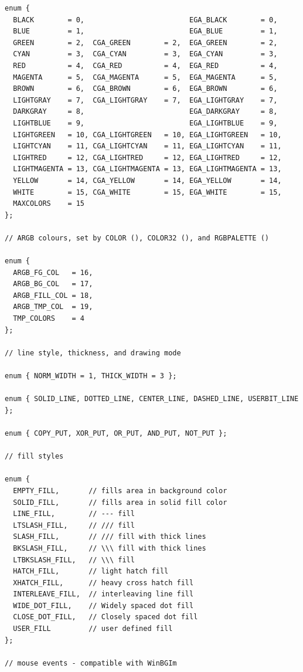 \documentclass[a4paper,12pt]{article}
\begin{document}
\begin{footnotesize}
\begin{spacing}{0.8}
\begin{verbatim}
enum {
  BLACK        = 0,                         EGA_BLACK        = 0,
  BLUE         = 1,                         EGA_BLUE         = 1,
  GREEN        = 2,  CGA_GREEN        = 2,  EGA_GREEN        = 2,
  CYAN         = 3,  CGA_CYAN         = 3,  EGA_CYAN         = 3,
  RED          = 4,  CGA_RED          = 4,  EGA_RED          = 4,
  MAGENTA      = 5,  CGA_MAGENTA      = 5,  EGA_MAGENTA      = 5,
  BROWN        = 6,  CGA_BROWN        = 6,  EGA_BROWN        = 6,
  LIGHTGRAY    = 7,  CGA_LIGHTGRAY    = 7,  EGA_LIGHTGRAY    = 7,
  DARKGRAY     = 8,                         EGA_DARKGRAY     = 8,
  LIGHTBLUE    = 9,                         EGA_LIGHTBLUE    = 9,
  LIGHTGREEN   = 10, CGA_LIGHTGREEN   = 10, EGA_LIGHTGREEN   = 10,
  LIGHTCYAN    = 11, CGA_LIGHTCYAN    = 11, EGA_LIGHTCYAN    = 11,
  LIGHTRED     = 12, CGA_LIGHTRED     = 12, EGA_LIGHTRED     = 12,
  LIGHTMAGENTA = 13, CGA_LIGHTMAGENTA = 13, EGA_LIGHTMAGENTA = 13,
  YELLOW       = 14, CGA_YELLOW       = 14, EGA_YELLOW       = 14,
  WHITE        = 15, CGA_WHITE        = 15, EGA_WHITE        = 15,
  MAXCOLORS    = 15
};

// ARGB colours, set by COLOR (), COLOR32 (), and RGBPALETTE ()

enum {
  ARGB_FG_COL   = 16,
  ARGB_BG_COL   = 17,
  ARGB_FILL_COL = 18,
  ARGB_TMP_COL  = 19,
  TMP_COLORS    = 4
};

// line style, thickness, and drawing mode

enum { NORM_WIDTH = 1, THICK_WIDTH = 3 };

enum { SOLID_LINE, DOTTED_LINE, CENTER_LINE, DASHED_LINE, USERBIT_LINE };

enum { COPY_PUT, XOR_PUT, OR_PUT, AND_PUT, NOT_PUT };

// fill styles

enum {
  EMPTY_FILL,       // fills area in background color
  SOLID_FILL,       // fills area in solid fill color
  LINE_FILL,        // --- fill
  LTSLASH_FILL,     // /// fill
  SLASH_FILL,       // /// fill with thick lines
  BKSLASH_FILL,     // \\\ fill with thick lines
  LTBKSLASH_FILL,   // \\\ fill
  HATCH_FILL,       // light hatch fill
  XHATCH_FILL,      // heavy cross hatch fill
  INTERLEAVE_FILL,  // interleaving line fill
  WIDE_DOT_FILL,    // Widely spaced dot fill
  CLOSE_DOT_FILL,   // Closely spaced dot fill
  USER_FILL         // user defined fill
};

// mouse events - compatible with WinBGIm


\end{verbatim}
\end{spacing}
\end{footnotesize}
\end{document}
